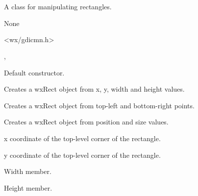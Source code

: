 \section{}\label{wxrect}

A class for manipulating rectangles.


None


<wx/gdicmn.h>


, 




Default constructor.


Creates a wxRect object from x, y, width and height values.


Creates a wxRect object from top-left and bottom-right points.


Creates a wxRect object from position and size values.



x coordinate of the top-level corner of the rectangle.



y coordinate of the top-level corner of the rectangle.



Width member.



Height member.

\label{wxrectdeflate}


